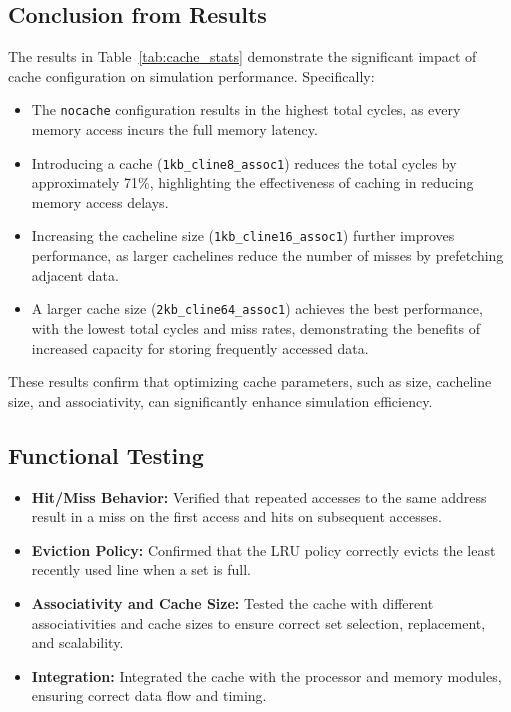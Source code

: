 \documentclass[12pt,a4paper]{report}
\begin{document}
\subsection{Conclusion from Results}
The results in Table~\ref{tab:cache_stats} demonstrate the significant impact of cache configuration on simulation performance. Specifically:
\begin{itemize}
  \item The \texttt{nocache} configuration results in the highest total cycles, as every memory access incurs the full memory latency.
  \item Introducing a cache (\texttt{1kb\_cline8\_assoc1}) reduces the total cycles by approximately 71\%, highlighting the effectiveness of caching in reducing memory access delays.
  \item Increasing the cacheline size (\texttt{1kb\_cline16\_assoc1}) further improves performance, as larger cachelines reduce the number of misses by prefetching adjacent data.
  \item A larger cache size (\texttt{2kb\_cline64\_assoc1}) achieves the best performance, with the lowest total cycles and miss rates, demonstrating the benefits of increased capacity for storing frequently accessed data.
\end{itemize}
These results confirm that optimizing cache parameters, such as size, cacheline size, and associativity, can significantly enhance simulation efficiency.

\subsection{Functional Testing}
\begin{itemize}
  \item \textbf{Hit/Miss Behavior:} Verified that repeated accesses to the same address result in a miss on the first access and hits on subsequent accesses.
  \item \textbf{Eviction Policy:} Confirmed that the LRU policy correctly evicts the least recently used line when a set is full.
  \item \textbf{Associativity and Cache Size:} Tested the cache with different associativities and cache sizes to ensure correct set selection, replacement, and scalability.
  \item \textbf{Integration:} Integrated the cache with the processor and memory modules, ensuring correct data flow and timing.
\end{itemize}
\end{document}
